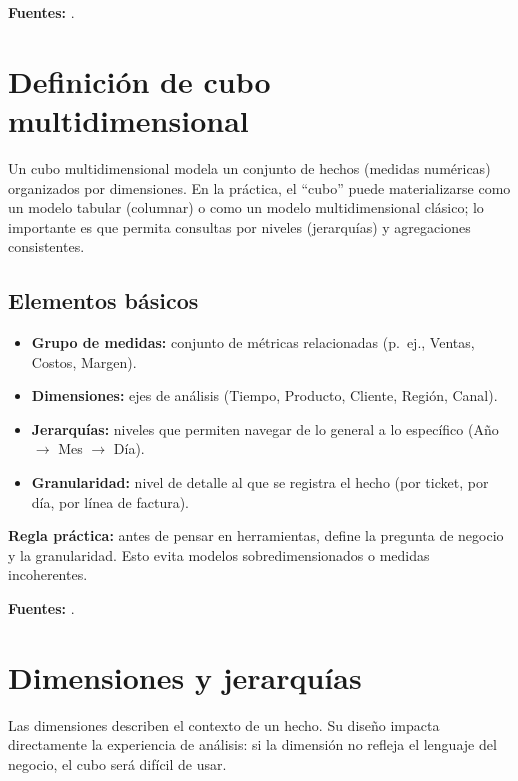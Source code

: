 \documentclass[12pt]{article}
\begin{document}
\noindent\textbf{Fuentes:} \cite{kimball_toolkit, mslearn_cubes_multidimensional, mslearn_ssas_intro}.

\section{Definición de cubo multidimensional}
Un cubo multidimensional modela un conjunto de hechos (medidas numéricas) organizados por dimensiones. En la práctica, el ``cubo'' puede materializarse como un modelo tabular (columnar) o como un modelo multidimensional clásico; lo importante es que permita consultas por niveles (jerarquías) y agregaciones consistentes.

\subsection*{Elementos básicos}
\begin{itemize}[leftmargin=*, itemsep=0.25em]
  \item \textbf{Grupo de medidas:} conjunto de métricas relacionadas (p.\ ej., Ventas, Costos, Margen).
  \item \textbf{Dimensiones:} ejes de análisis (Tiempo, Producto, Cliente, Región, Canal).
  \item \textbf{Jerarquías:} niveles que permiten navegar de lo general a lo específico (Año \(\rightarrow\) Mes \(\rightarrow\) Día).
  \item \textbf{Granularidad:} nivel de detalle al que se registra el hecho (por ticket, por día, por línea de factura).
\end{itemize}

\noindent\textbf{Regla práctica:} antes de pensar en herramientas, define la pregunta de negocio y la granularidad. Esto evita modelos sobredimensionados o medidas incoherentes.

\noindent\textbf{Fuentes:} \cite{mslearn_cubes_multidimensional, mslearn_ssas_intro, kimballgroup_star_olap}.

\section{Dimensiones y jerarquías}
Las dimensiones describen el contexto de un hecho. Su diseño impacta directamente la experiencia de análisis: si la dimensión no refleja el lenguaje del negocio, el cubo será difícil de usar.
\end{document}
